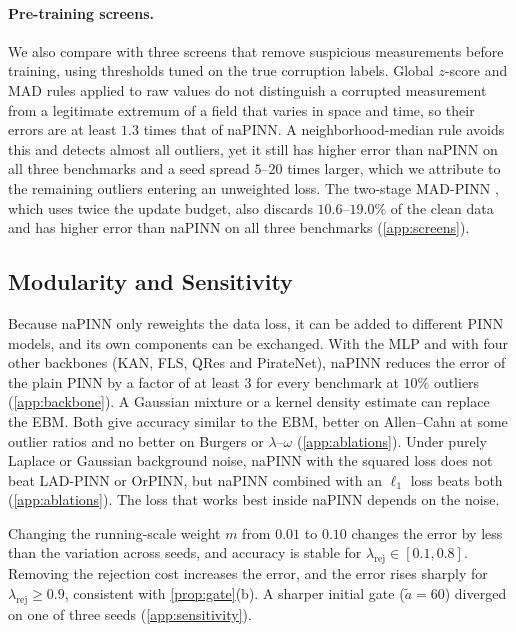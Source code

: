 \documentclass[twoside]{article}
\newcommand{\rej}{\lambda_{\mathrm{rej}}}
\begin{document}
\paragraph{Pre-training screens.}
We also compare with three screens that remove suspicious measurements before
training, using thresholds tuned on the true corruption labels. Global $z$-score and MAD rules applied to raw values do not distinguish
a corrupted measurement from a legitimate extremum of a field that varies in
space and time, so their errors are at least $1.3$ times that of naPINN. A neighborhood-median rule avoids this and detects almost all
outliers, yet it still has higher error than naPINN on all three benchmarks and
a seed spread $5$--$20$ times larger, which we attribute to the remaining
outliers entering an unweighted loss. The two-stage MAD-PINN \citep{Peng2022},
which uses twice the update budget, also discards $10.6$--$19.0\%$ of the clean
data and has higher error than naPINN on all three benchmarks
(\cref{app:screens}).

\subsection{Modularity and Sensitivity}
\label{sec:practical}
Because naPINN only reweights the data loss, it can be added to different PINN
models, and its own components can be exchanged. With
the MLP and with four other backbones (KAN, FLS, QRes and PirateNet), naPINN
reduces the error of the plain PINN by a factor of at least $3$ for
every benchmark at $10\%$ outliers (\cref{app:backbone}). A Gaussian
mixture or a kernel density estimate can replace the EBM. Both give accuracy
similar to the EBM, better on Allen--Cahn at some outlier ratios and no better
on Burgers or $\lambda$--$\omega$ (\cref{app:ablations}). Under purely Laplace or Gaussian
background noise, naPINN with the squared loss does not beat LAD-PINN or OrPINN,
but naPINN combined with an $\ell_1$ loss beats both (\cref{app:ablations}). The
loss that works best inside naPINN depends on the noise.

Changing the running-scale weight $m$ from $0.01$ to $0.10$ changes the error
by less than the variation across seeds, and accuracy is stable for
$\rej \in [0.1, 0.8]$. Removing the rejection cost increases the error, and the
error rises sharply for $\rej \ge 0.9$, consistent with \cref{prop:gate}(b). A sharper
initial gate ($\tilde a = 60$) diverged on one of three seeds (\cref{app:sensitivity}).

\end{document}
